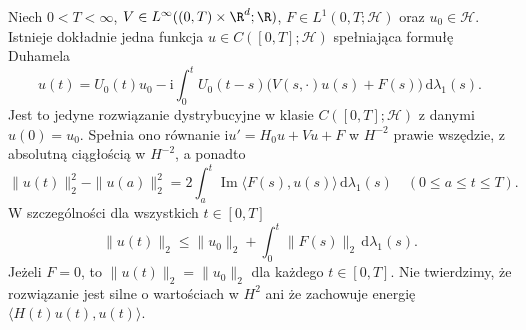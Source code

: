 \begin{twierdzenie}
\label{thm:pde22-time-potential}
Niech $0<T<\infty$, $V\in L^\infty((0,T)\times\R^d;\R)$,
$F\in L^1(0,T;\mathcal H)$ oraz $u_0\in\mathcal H$.
Istnieje dokładnie jedna funkcja
$u\in C([0,T];\mathcal H)$ spełniająca formułę Duhamela
\[
 u(t)=U_0(t)u_0-\mathrm i\int_0^tU_0(t-s)
       \bigl(V(s,\cdot)u(s)+F(s)\bigr)\,\mathrm d\lambda_1(s).
\]
Jest to jedyne rozwiązanie dystrybucyjne
w klasie $C([0,T];\mathcal H)$ z danymi $u(0)=u_0$.
Spełnia ono równanie
$\mathrm iu'=H_0u+Vu+F$ w $H^{-2}$ prawie wszędzie,
z absolutną ciągłością w $H^{-2}$, a ponadto
\[
 \|u(t)\|_2^2-\|u(a)\|_2^2
 =2\int_a^t\operatorname{Im}\langle F(s),u(s)\rangle
       \,\mathrm d\lambda_1(s)
 \quad(0\le a\le t\le T).
\]
W szczególności dla wszystkich $t\in[0,T]$
\[
 \|u(t)\|_2\le\|u_0\|_2+\int_0^t\|F(s)\|_2\,\mathrm d\lambda_1(s).
\]
Jeżeli $F=0$, to $\|u(t)\|_2=\|u_0\|_2$ dla każdego
$t\in[0,T]$. Nie twierdzimy, że rozwiązanie jest
silne o wartościach w $H^2$ ani że zachowuje energię
$\langle H(t)u(t),u(t)\rangle$.
\end{twierdzenie}
